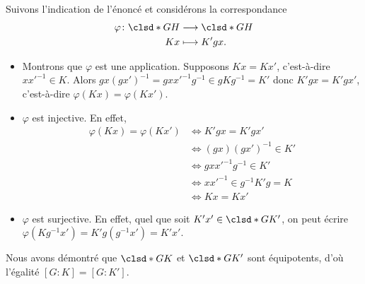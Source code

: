 Suivons l'indication de l'énoncé et considérons la correspondance
%
\begin{align*}
  \varphi\colon\clsd*{G}{H} &\longrightarrow\clsd*{G}{H} \\
                        Kx &\longmapsto K'gx.
\end{align*}
%
\begin{itemize}
  \item 
    Montrons que $\varphi$ est une application. Supposons $Kx = Kx'$,
    c'est-à-dire $xx'^{-1}\in K$. Alors 
    $gx(gx')^{-1} = gxx'^{-1}g^{-1} \in gKg^{-1} = K'$ donc $K'gx=K'gx'$,
    c'est-à-dire $\varphi(Kx)=\varphi(Kx')$. 

  \item
    $\varphi$ est injective. En effet,
    \begin{align*} 
      \varphi(Kx) = \varphi(Kx')
        &\iff K'gx = K'gx'\\ 
        &\iff (gx)(gx')^{-1} \in K'\\ 
        &\iff gxx'^{-1}g^{-1} \in K'\\ 
        &\iff xx'^{-1} \in g^{-1}K'g = K\\ 
        &\iff Kx = Kx' 
    \end{align*} 
  \item 
    $\varphi$ est surjective. En effet, quel que soit
    $K'x' \in \clsd*{G}{K'}$, on peut écrire
    $\varphi(Kg^{-1}x') = K'g(g^{-1}x') = K'x'$.
\end{itemize}

Nous avons démontré que $\clsd*{G}{K}$ et $\clsd*{G}{K'}$ sont équipotents, d'où
l'égalité $[G:K]=[G:K']$.
